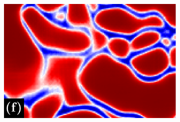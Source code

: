 \begin{figure}[t]
\begin{subfigure}[t]{0.32\linewidth}
\includegraphics[width=0.99\linewidth,trim=0in 0in 0in 0.2in,clip]{./figures/LSIMasks/aff_compare_designer/mask_1.pdf} %
\end{subfigure}






\end{figure}
